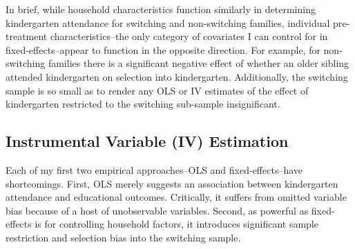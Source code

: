 In brief, while household characteristics function similarly in determining kindergarten attendance for switching and non-switching families, individual pre-treatment characteristics--the only category of covariates I can control for in fixed-effects--appear to function in the opposite direction. For example, for non-switching families there is a significant negative effect of whether an older sibling attended kindergarten on selection into kindergarten. Additionally, the switching sample is so small as to render any OLS or IV estimates of the effect of kindergarten restricted to the switching sub-sample insignificant. 

\subsection{Instrumental Variable (IV) Estimation}
Each of my first two empirical approaches--OLS and fixed-effects--have shortcomings. First, OLS merely suggests an association between kindergarten attendance and educational outcomes. Critically, it suffers from omitted variable bias because of a host of unobservable variables. Second, as powerful as fixed-effects is for controlling household factors, it introduces significant sample restriction and selection bias into the switching sample.

